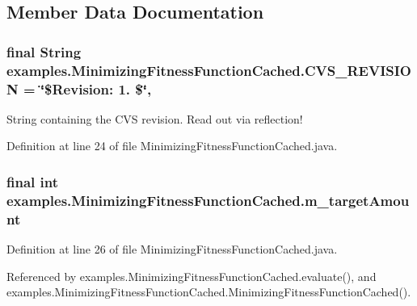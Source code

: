 \subsection{Member Data Documentation}
\hypertarget{classexamples_1_1_minimizing_fitness_function_cached_a9fb7f9516277373c7415655070fc1ee6}{
\subsubsection[{C\-V\-S\-\_\-\-R\-E\-V\-I\-S\-I\-O\-N}]{\setlength{\rightskip}{0pt plus 5cm}final String examples.\-Minimizing\-Fitness\-Function\-Cached.\-C\-V\-S\-\_\-\-R\-E\-V\-I\-S\-I\-O\-N = \char`\"{}\$Revision\-: 1. \$\char`\"{}\hspace{0.3cm}{\ttfamily [static]}, {\ttfamily [private]}}}\label{classexamples_1_1_minimizing_fitness_function_cached_a9fb7f9516277373c7415655070fc1ee6}
String containing the C\-V\-S revision. Read out via reflection! 

Definition at line 24 of file Minimizing\-Fitness\-Function\-Cached.\-java.

\hypertarget{classexamples_1_1_minimizing_fitness_function_cached_a38e378b14a375bcf4f70b9e7deb89eed}{
\subsubsection[{m\-\_\-target\-Amount}]{\setlength{\rightskip}{0pt plus 5cm}final int examples.\-Minimizing\-Fitness\-Function\-Cached.\-m\-\_\-target\-Amount\hspace{0.3cm}{\ttfamily [private]}}}\label{classexamples_1_1_minimizing_fitness_function_cached_a38e378b14a375bcf4f70b9e7deb89eed}


Definition at line 26 of file Minimizing\-Fitness\-Function\-Cached.\-java.



Referenced by examples.\-Minimizing\-Fitness\-Function\-Cached.\-evaluate(), and examples.\-Minimizing\-Fitness\-Function\-Cached.\-Minimizing\-Fitness\-Function\-Cached().

